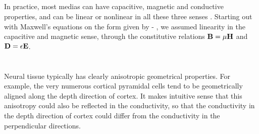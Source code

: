 \subsection{ }
\label{sec:Basics:LinEx}
In practice, most medias can  have capacitive, magnetic and conductive properties, and can be linear or nonlinear in all these three senses . Starting out with Maxwell's equations on the form given by - , we assumed linearity in the capacitive and magnetic sense, through the constitutive relations ${\bf B} = \mu{\bf H}$ and ${\bf D} = \epsilon {\bf E}$.














\section{ }













\section{}
\label{sec:Sigma:Anisotropic}
Neural tissue typically has clearly anisotropic geometrical properties. For example, the very numerous cortical pyramidal cells tend to be geometrically aligned along the depth direction of cortex. It makes intuitive sense that this anisotropy could also be reflected in the conductivity, so that the conductivity in the depth direction of cortex could differ from the conductivity  in the perpendicular directions. 


